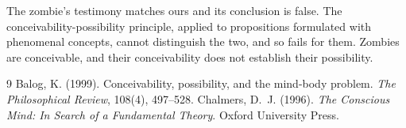 \documentclass{situationist-preprint}
\begin{document}
The zombie's testimony matches ours and its conclusion is false. The conceivability-possibility principle, applied to propositions formulated with phenomenal concepts, cannot distinguish the two, and so fails for them. Zombies are conceivable, and their conceivability does not establish their possibility.

\begin{thebibliography}{9}\small
{} Balog, K. (1999). Conceivability, possibility, and the mind-body problem. \emph{The Philosophical Review}, 108(4), 497--528.
 Chalmers, D.~J. (1996). \emph{The Conscious Mind: In Search of a Fundamental Theory}. Oxford University Press.
\end{thebibliography}
\end{document}
